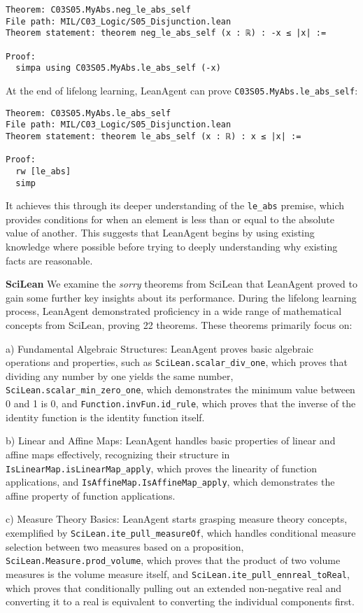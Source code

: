 \documentclass{article} %
\begin{document}
\begin{verbatim}
Theorem: C03S05.MyAbs.neg_le_abs_self
File path: MIL/C03_Logic/S05_Disjunction.lean
Theorem statement: theorem neg_le_abs_self (x : ℝ) : -x ≤ |x| :=

Proof:
  simpa using C03S05.MyAbs.le_abs_self (-x)
\end{verbatim}

At the end of lifelong learning, LeanAgent can prove \texttt{C03S05.MyAbs.le\_abs\_self}:

\begin{verbatim}
Theorem: C03S05.MyAbs.le_abs_self
File path: MIL/C03_Logic/S05_Disjunction.lean
Theorem statement: theorem le_abs_self (x : ℝ) : x ≤ |x| :=

Proof:
  rw [le_abs]
  simp
\end{verbatim}

It achieves this through its deeper understanding of the \texttt{le\_abs} premise, which provides conditions for when an element is less than or equal to the absolute value of another. This suggests that LeanAgent begins by using existing knowledge where possible before trying to deeply understanding why existing facts are reasonable.

\textbf{SciLean} We examine the \textit{sorry} theorems from SciLean that LeanAgent proved to gain some further key insights about its performance. During the lifelong learning process, LeanAgent demonstrated proficiency in a wide range of mathematical concepts from SciLean, proving 22 theorems. These theorems primarily focus on:

a) Fundamental Algebraic Structures:
LeanAgent proves basic algebraic operations and properties, such as \texttt{SciLean.scalar\_div\_one}, which proves that dividing any number by one yields the same number, \texttt{SciLean.scalar\_min\_zero\_one}, which demonstrates the minimum value between 0 and 1 is 0, and \texttt{Function.invFun.id\_rule}, which proves that the inverse of the identity function is the identity function itself.

b) Linear and Affine Maps:
LeanAgent handles basic properties of linear and affine maps effectively, recognizing their structure in \texttt{IsLinearMap.isLinearMap\_apply}, which proves the linearity of function applications, and \texttt{IsAffineMap.IsAffineMap\_apply}, which demonstrates the affine property of function applications.

c) Measure Theory Basics:
LeanAgent starts grasping measure theory concepts, exemplified by \texttt{SciLean.ite\_pull\_measureOf}, which handles conditional measure selection between two measures based on a proposition, \texttt{SciLean.Measure.prod\_volume}, which proves that the product of two volume measures is the volume measure itself, and \texttt{SciLean.ite\_pull\_ennreal\_toReal}, which proves that conditionally pulling out an extended non-negative real and converting it to a real is equivalent to converting the individual components first.
\end{document}
